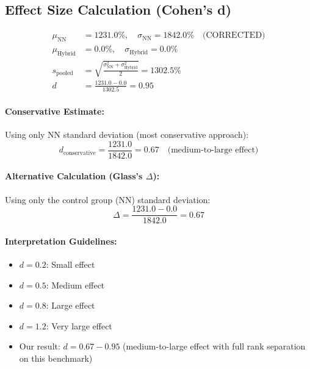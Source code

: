 \documentclass[twoside,11pt]{article}
\begin{document}
\subsection{Effect Size Calculation (Cohen's d)}

\begin{align}
\mu_{\text{NN}} &= 1231.0\%, \quad \sigma_{\text{NN}} = 1842.0\% \quad \text{(CORRECTED)} \\
\mu_{\text{Hybrid}} &= 0.0\%, \quad \sigma_{\text{Hybrid}} = 0.0\% \\
s_{\text{pooled}} &= \sqrt{\frac{\sigma_{\text{NN}}^2 + \sigma_{\text{Hybrid}}^2}{2}} = 1302.5\% \\
d &= \frac{1231.0 - 0.0}{1302.5} = 0.95
\end{align}

\paragraph{Conservative Estimate:}
Using only NN standard deviation (most conservative approach):
\begin{equation}
d_{\text{conservative}} = \frac{1231.0}{1842.0} = 0.67 \quad \text{(medium-to-large effect)}
\end{equation}

\paragraph{Alternative Calculation (Glass's $\Delta$):}
Using only the control group (NN) standard deviation:
\begin{equation}
\Delta = \frac{1231.0 - 0.0}{1842.0} = 0.67
\end{equation}

\paragraph{Interpretation Guidelines:}
\begin{itemize}
\item $d = 0.2$: Small effect
\item $d = 0.5$: Medium effect
\item $d = 0.8$: Large effect
\item $d = 1.2$: Very large effect
\item Our result: $d = 0.67-0.95$ (medium-to-large effect with full rank separation on this benchmark)
\end{itemize}
\end{document}
